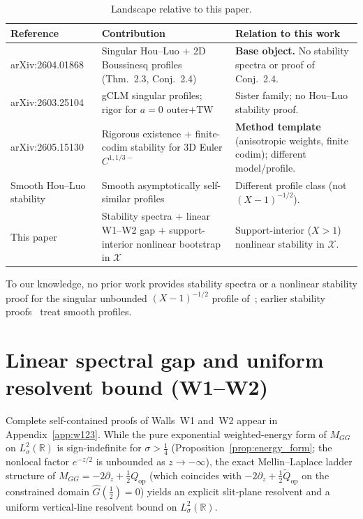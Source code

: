 \documentclass[11pt,a4paper]{article}
\begin{document}
\begin{table}[h]
\centering
\caption{Landscape relative to this paper.}
\label{tab:related}
\begin{tabular}{@{}p{3.6cm}p{5.2cm}p{5.4cm}@{}}
\toprule
Reference & Contribution & Relation to this work \\
\midrule
arXiv:2604.01868 \cite{chen2026houluo} &
  Singular Hou--Luo + 2D Boussinesq profiles (Thm.~2.3, Conj.~2.4) &
  \textbf{Base object.} No stability spectra or proof of Conj.~2.4. \\
arXiv:2603.25104 \cite{huang2026gclm} &
  gCLM singular profiles; rigor for $a=0$ outer+TW &
  Sister family; no Hou--Luo stability proof. \\
arXiv:2605.15130 \cite{chen2026euler} &
  Rigorous existence + finite-codim stability for 3D Euler $C^{1,1/3-}$ &
  \textbf{Method template} (anisotropic weights, finite codim); different model/profile. \\
Smooth Hou--Luo stability \cite{chen2021hl,huang2023exact} &
  Smooth asymptotically self-similar profiles &
  Different profile class (not $(X-1)^{-1/2}$). \\
This paper &
  Stability spectra + linear W1--W2 gap + support-interior nonlinear bootstrap in $\mathcal{X}$ &
  Support-interior ($X>1$) nonlinear stability in $\mathcal{X}$. \\
\bottomrule
\end{tabular}
\end{table}

To our knowledge, no prior work provides stability spectra or a nonlinear stability proof
for the singular unbounded $(X-1)^{-1/2}$ profile of~\cite{chen2026houluo}; earlier
stability proofs~\cite{chen2021hl,huang2023exact} treat smooth profiles.

\section{Linear spectral gap and uniform resolvent bound (W1--W2)}
\label{sec:w123}

Complete self-contained proofs of Walls~W1 and~W2 appear in Appendix~\ref{app:w123}.
While the pure exponential weighted-energy form of $M_{GG}$ on $L^2_\sigma(\mathbb{R})$ is sign-indefinite for
$\sigma>\tfrac14$ (Proposition~\ref{prop:energy_form}; the nonlocal factor $e^{-z/2}$ is unbounded as $z\to-\infty$),
the exact Mellin--Laplace ladder structure of $M_{GG}=-2\partial_z+\tfrac12 Q_{\mathrm{op}}$
(which coincides with $-2\partial_z+\tfrac12\widetilde{Q}_{\mathrm{op}}$ on the constrained domain $\widehat{G}(\tfrac12)=0$)
yields an explicit slit-plane resolvent and a uniform vertical-line resolvent bound on
$L^2_\sigma(\mathbb{R})$.
\end{document}
